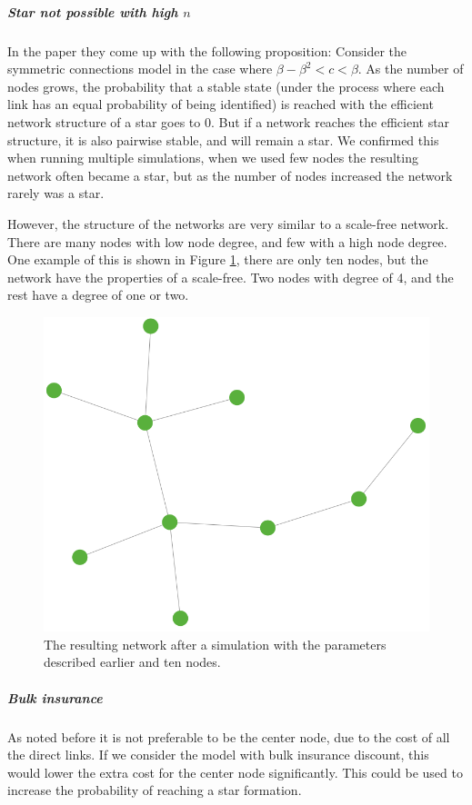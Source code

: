 \subparagraph{Star not possible with high $n$}
In the paper \cite{jackson2005survey} they come up with the following proposition:
Consider the symmetric connections model in the case where $\beta-\beta^2<c<\beta$. As the number of nodes grows, the probability that a stable state (under the process where each link has an equal probability of being identified) is reached with the efficient network structure of a star goes to 0. But if a network reaches the efficient star structure, it is also pairwise stable, and will remain a star. 
We confirmed this when running multiple simulations, when we used few nodes the resulting network often became a star, but as the number of nodes increased the network rarely was a star. 

However, the structure of the networks are very similar to a scale-free network. There are many nodes with low node degree, and few with a high node degree.
One example of this is shown in Figure \ref{fig:stablescalefree}, there are only ten nodes, but the network have the properties of a scale-free. Two nodes with degree of 4, and the rest have a degree of one or two.
\begin{figure}[h]
\centering
  \includegraphics[width=0.5\linewidth]{../Figures/stability/Unefficientbutstabletwo.png}
  \caption{\label{fig:stablescalefree} The resulting network after a simulation with the parameters described earlier and ten nodes.}
\end{figure}
\subparagraph{Bulk insurance}
As noted before it is not preferable to be the center node, due to the cost of all the direct links. If we consider the model with bulk insurance discount, this would lower the extra cost for the center node significantly. This could be used to increase the probability of reaching a star formation. 

